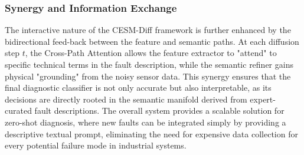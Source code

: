 \subsubsection{Synergy and Information Exchange}
The interactive nature of the CESM-Diff framework is further enhanced by the bidirectional feed-back between the feature and semantic paths. At each diffusion step $t$, the Cross-Path Attention allows the feature extractor to "attend" to specific technical terms in the fault description, while the semantic refiner gains physical "grounding" from the noisy sensor data. This synergy ensures that the final diagnostic classifier is not only accurate but also interpretable, as its decisions are directly rooted in the semantic manifold derived from expert-curated fault descriptions. The overall system provides a scalable solution for zero-shot diagnosis, where new faults can be integrated simply by providing a descriptive textual prompt, eliminating the need for expensive data collection for every potential failure mode in industrial systems.
